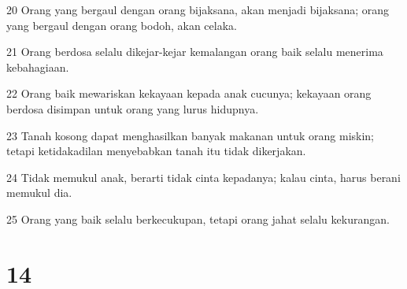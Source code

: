 \par 20 Orang yang bergaul dengan orang bijaksana, akan menjadi bijaksana; orang yang bergaul dengan orang bodoh, akan celaka.
\par 21 Orang berdosa selalu dikejar-kejar kemalangan orang baik selalu menerima kebahagiaan.
\par 22 Orang baik mewariskan kekayaan kepada anak cucunya; kekayaan orang berdosa disimpan untuk orang yang lurus hidupnya.
\par 23 Tanah kosong dapat menghasilkan banyak makanan untuk orang miskin; tetapi ketidakadilan menyebabkan tanah itu tidak dikerjakan.
\par 24 Tidak memukul anak, berarti tidak cinta kepadanya; kalau cinta, harus berani memukul dia.
\par 25 Orang yang baik selalu berkecukupan, tetapi orang jahat selalu kekurangan.

\chapter{14}

